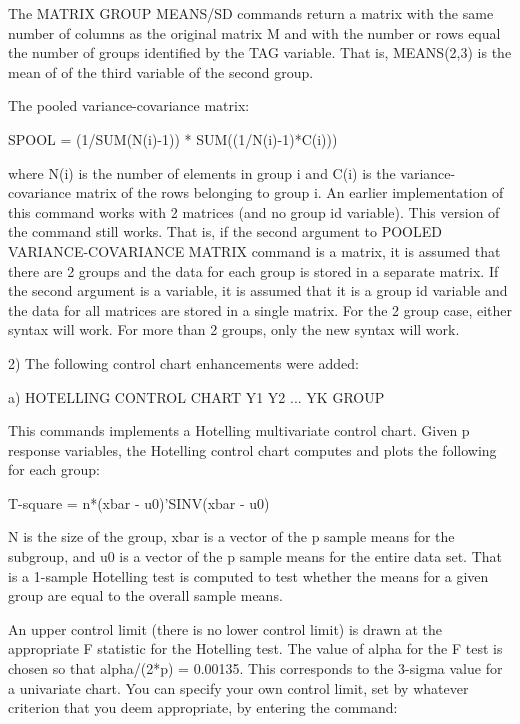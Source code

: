 {    The MATRIX GROUP MEANS/SD commands return a matrix with the
    same number of columns as the original matrix M and with
    the number or rows equal the number of groups identified
    by the TAG variable.  That is, MEANS(2,3) is the mean of
    of the third variable of the second group.

    The pooled variance-covariance matrix:

        SPOOL = (1/SUM(N(i)-1)) * SUM((1/N(i)-1)*C(i)))

    where N(i) is the number of elements in group i and C(i)
    is the variance-covariance matrix of the rows belonging to
    group i.  An earlier implementation of this command
    works with 2 matrices (and no group id variable).  This
    version of the command still works.  That is, if the second
    argument to POOLED VARIANCE-COVARIANCE MATRIX command is
    a matrix, it is assumed that there are 2 groups and the
    data for each group is stored in a separate matrix.  If the
    second argument is a variable, it is assumed that it is a
    group id variable and the data for all matrices are stored
    in a single matrix.  For the 2 group case, either syntax
    will work.  For more than 2 groups, only the new syntax
    will work.

 2) The following control chart enhancements were added:

    a) HOTELLING CONTROL CHART Y1 Y2 ... YK GROUP

       This commands implements a Hotelling multivariate
       control chart.   Given p response variables, the Hotelling
       control chart computes and plots the following for each group:

         T-square = n*(xbar - u0)'SINV(xbar - u0)

       N is the size of the group, xbar is a vector of the p
       sample means for the subgroup, and u0 is a vector of the
       p sample means for the entire data set.  That is a 1-sample
       Hotelling test is computed to test whether the means for
       a given group are equal to the overall sample means.

       An upper control limit (there is no lower control limit)
       is drawn at the appropriate F statistic for the Hotelling
       test.  The value of alpha for the F test is chosen so
       that alpha/(2*p) = 0.00135.  This corresponds to the
       3-sigma value for a univariate chart.  You can specify
       your own control limit, set by whatever criterion that
       you deem appropriate,  by entering the command:

}
